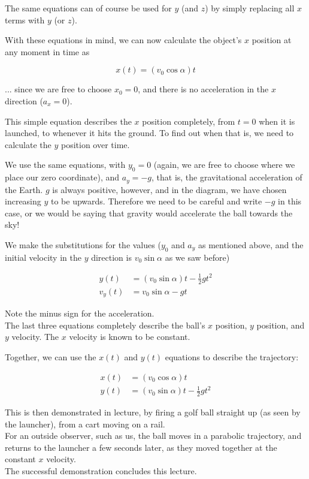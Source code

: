 The same equations can of course be used for $y$ (and $z$) by simply replacing all $x$ terms with $y$ (or $z$).

With these equations in mind, we can now calculate the object's $x$ position at any moment in time as

\begin{equation}
x(t) = (v_0 \cos \alpha) t
\end{equation}

... since we are free to choose $x_0 = 0$, and there is no acceleration in the $x$ direction ($a_x = 0$).

This simple equation describes the $x$ position completely, from $t=0$ when it is launched, to whenever it hits the ground. To find out when that is, we need to calculate the $y$ position over time.

We use the same equations, with $y_0 = 0$	 (again, we are free to choose where we place our zero coordinate), and $a_y = -g$, that is, the gravitational acceleration of the Earth. $g$ is always positive, however, and in the diagram, we have chosen increasing $y$ to be upwards. Therefore we need to be careful and write $-g$ in this case, or we would be saying that gravity would accelerate the ball towards the sky!

We make the substitutions for the values ($y_0$ and $a_y$ as mentioned above, and the initial velocity in the $y$ direction is $v_0 \sin \alpha$ as we saw before)

\begin{align}
y(t) &= (v_0 \sin \alpha) t - \frac{1}{2} g t^2\\
v_y(t) &= v_0 \sin \alpha - g t
\end{align}

Note the minus sign for the acceleration.\\
The last three equations completely describe the ball's $x$ position, $y$ position, and $y$ velocity. The $x$ velocity is known to be constant.

Together, we can use the $x(t)$ and $y(t)$ equations to describe the trajectory:

\begin{align*}
x(t) &= (v_0 \cos \alpha) t\\
y(t) &= (v_0 \sin \alpha) t - \frac{1}{2} g t^2
\end{align*}

This is then demonstrated in lecture, by firing a golf ball straight up (as seen by the launcher), from a cart moving on a rail.\\
For an outside observer, such as us, the ball moves in a parabolic trajectory, and returns to the launcher a few seconds later, as they moved together at the constant $x$ velocity.\\
The successful demonstration concludes this lecture.

